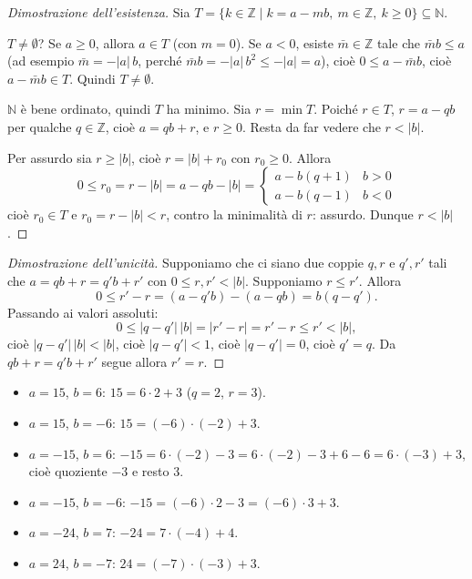 \documentclass[11pt,a4paper]{article}
\begin{document}
\begin{proof}[Dimostrazione dell'esistenza]
Sia $T = \{k \in \mathbb{Z} \mid k = a - mb,\ m \in \mathbb{Z},\ k \ge 0\} \subseteq \mathbb{N}$.

$T \neq \emptyset$? Se $a \ge 0$, allora $a \in T$ (con $m = 0$). Se $a < 0$, esiste $\bar m \in \mathbb{Z}$ tale che $\bar m b \le a$ (ad esempio $\bar m = -|a|\,b$, perché $\bar m b = -|a|\,b^2 \le -|a| = a$), cioè $0 \le a - \bar m b$, cioè $a - \bar m b \in T$. Quindi $T \neq \emptyset$.

$\mathbb{N}$ è bene ordinato, quindi $T$ ha minimo. Sia $r = \min T$. Poiché $r \in T$, $r = a - qb$ per qualche $q \in \mathbb{Z}$, cioè $a = qb + r$, e $r \ge 0$. Resta da far vedere che $r < |b|$.

Per assurdo sia $r \ge |b|$, cioè $r = |b| + r_0$ con $r_0 \ge 0$. Allora
\[
  0 \le r_0 = r - |b| = a - qb - |b| = \begin{cases} a - b(q + 1) & b > 0 \\ a - b(q - 1) & b < 0 \end{cases}
\]
cioè $r_0 \in T$ e $r_0 = r - |b| < r$, contro la minimalità di $r$: assurdo. Dunque $r < |b|$.
\end{proof}

\begin{proof}[Dimostrazione dell'unicità]
Supponiamo che ci siano due coppie $q, r$ e $q', r'$ tali che $a = qb + r = q'b + r'$ con $0 \le r, r' < |b|$. Supponiamo $r \le r'$. Allora
\[
  0 \le r' - r = (a - q'b) - (a - qb) = b(q - q') .
\]
Passando ai valori assoluti:
\[
  0 \le |q - q'|\,|b| = |r' - r| = r' - r \le r' < |b| ,
\]
cioè $|q - q'|\,|b| < |b|$, cioè $|q - q'| < 1$, cioè $|q - q'| = 0$, cioè $q' = q$. Da $qb + r = q'b + r'$ segue allora $r' = r$.
\end{proof}

\begin{esempio}
\begin{itemize}
  \item $a = 15$, $b = 6$: $15 = 6\cdot 2 + 3$ ($q = 2$, $r = 3$).
  \item $a = 15$, $b = -6$: $15 = (-6)\cdot(-2) + 3$.
  \item $a = -15$, $b = 6$: $-15 = 6\cdot(-2) - 3 = 6\cdot(-2) - 3 + 6 - 6 = 6\cdot(-3) + 3$, cioè quoziente $-3$ e resto $3$.
  \item $a = -15$, $b = -6$: $-15 = (-6)\cdot 2 - 3 = (-6)\cdot 3 + 3$.
  \item $a = -24$, $b = 7$: $-24 = 7\cdot(-4) + 4$.
  \item $a = 24$, $b = -7$: $24 = (-7)\cdot(-3) + 3$.
\end{itemize}
\end{esempio}
\end{document}
